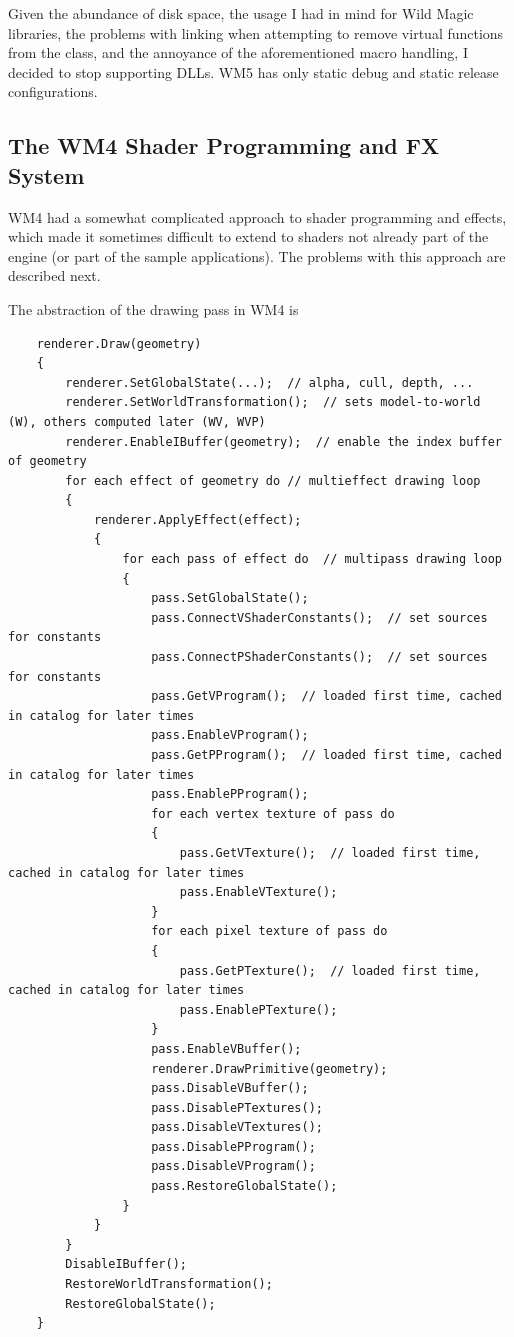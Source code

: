 \documentclass{article}
\begin{document}
Given the abundance of disk space, the usage I had in mind for Wild Magic
libraries, the problems with linking when attempting to remove virtual
functions from the  class, and the annoyance of the
aforementioned macro handling, I decided to stop supporting DLLs.  WM5 has
only static debug and static release configurations.

\subsection{The WM4 Shader Programming and FX System}

WM4 had a somewhat complicated approach to shader programming and effects,
which made it sometimes difficult to extend to shaders not already part of
the engine (or part of the sample applications).  The problems with this
approach are described next.

The abstraction of the drawing pass in WM4 is

\scriptsize
\begin{verbatim}
    renderer.Draw(geometry)
    {
        renderer.SetGlobalState(...);  // alpha, cull, depth, ...
        renderer.SetWorldTransformation();  // sets model-to-world (W), others computed later (WV, WVP)
        renderer.EnableIBuffer(geometry);  // enable the index buffer of geometry
        for each effect of geometry do // multieffect drawing loop
        {
            renderer.ApplyEffect(effect);
            {
                for each pass of effect do  // multipass drawing loop
                {
                    pass.SetGlobalState();
                    pass.ConnectVShaderConstants();  // set sources for constants
                    pass.ConnectPShaderConstants();  // set sources for constants
                    pass.GetVProgram();  // loaded first time, cached in catalog for later times
                    pass.EnableVProgram();
                    pass.GetPProgram();  // loaded first time, cached in catalog for later times
                    pass.EnablePProgram();
                    for each vertex texture of pass do
                    {
                        pass.GetVTexture();  // loaded first time, cached in catalog for later times
                        pass.EnableVTexture();
                    }
                    for each pixel texture of pass do
                    {
                        pass.GetPTexture();  // loaded first time, cached in catalog for later times
                        pass.EnablePTexture();
                    }
                    pass.EnableVBuffer();
                    renderer.DrawPrimitive(geometry);
                    pass.DisableVBuffer();
                    pass.DisablePTextures();
                    pass.DisableVTextures();
                    pass.DisablePProgram();
                    pass.DisableVProgram();
                    pass.RestoreGlobalState();
                }
            }
        }
        DisableIBuffer();
        RestoreWorldTransformation();
        RestoreGlobalState();
    }
\end{verbatim}
\normalsize
\end{document}
